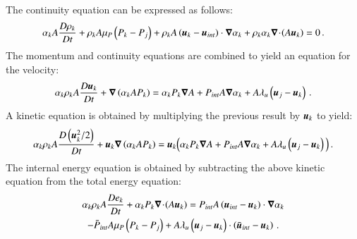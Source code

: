 \documentclass[preprint,10pt]{elsarticle}
\begin{document}
{\begin{appendices}
The continuity equation can be expressed as follows:
\begin{equation}
\label{eq:cont1-app}
\alpha_k A \frac{D \rho_k}{Dt} + \rho_k A \mu_P \left( P_k-P_j \right) + \rho_k A \left( \boldsymbol u_k-\boldsymbol u_{int} \right) \cdot \boldsymbol\nabla \alpha_k + \rho_k \alpha_k \boldsymbol\nabla\! \cdot \! \left( A \boldsymbol u_k \right) = 0 \,.
\end{equation}
The momentum and continuity equations are combined to yield an equation for the velocity:
\begin{equation}
\label{eq:vel1-app}
\alpha_k \rho_k A \frac{D\boldsymbol u_k}{Dt} + \boldsymbol\nabla \left( \alpha_k A P_k \right) = \alpha_k P_k \boldsymbol\nabla A + P_{int} A \boldsymbol\nabla \alpha_k + A \lambda_u \left( \boldsymbol u_j-\boldsymbol u_k \right) \,.
\end{equation}
A kinetic equation is obtained by multiplying the previous result by $\boldsymbol u_k$ to yield:
\begin{equation}
\label{eq:kin1-app}
\alpha_k \rho_k A \frac{D\left(\boldsymbol u_k^2/2\right)}{Dt} + \boldsymbol u_k \boldsymbol\nabla \left( \alpha_k A P_k \right) = \boldsymbol u_k  \Big( \alpha_k P_k \boldsymbol\nabla A + P_{int} A \boldsymbol\nabla \alpha_k + A \lambda_u \left( \boldsymbol u_j-\boldsymbol u_k \right) \Big) \,.
\end{equation}
%
The internal energy equation is obtained by subtracting the above kinetic equation from the total energy equation:
\begin{multline}\label{eq:internal1}
\alpha_k \rho_k A \frac{D e_k}{Dt} + \alpha_k P_k \boldsymbol\nabla\! \cdot \! \left(A \boldsymbol u_k \right) = 
 P_{int} A \left(\boldsymbol u_{int}-\boldsymbol u_k \right) \cdot \boldsymbol\nabla \alpha_k \\
 - \bar{P}_{int} A \mu_P \left(P_k-P_j \right) + A \lambda_u \left(\boldsymbol u_j-\boldsymbol u_k  \right) \cdot \left(\bar{\boldsymbol u}_{int}-\boldsymbol u_k \right) \,.
\end{multline}



\end{appendices}}
\end{document}

